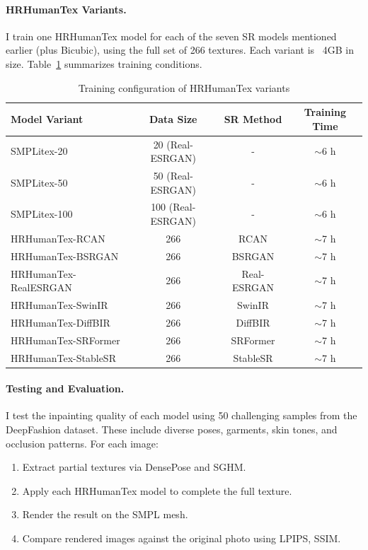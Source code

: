 \paragraph{HRHumanTex Variants.}
I train one HRHumanTex model for each of the seven SR models mentioned earlier (plus Bicubic), using the full set of 266 textures. Each variant is ~4GB in size. Table~\ref{tab:hrhumantex-variants} summarizes training conditions.

\begin{table}[h]
\centering
\caption{Training configuration of HRHumanTex variants}
\label{tab:hrhumantex-variants}
\begin{tabular}{lccc}
\toprule
Model Variant & Data Size & SR Method & Training Time \\
\midrule
SMPLitex-20         & 20 (Real-ESRGAN) & -          & $\sim$6 h \\
SMPLitex-50         & 50 (Real-ESRGAN) & -          & $\sim$6 h \\
SMPLitex-100        & 100 (Real-ESRGAN) & -         & $\sim$6 h \\
HRHumanTex-RCAN     & 266 & RCAN       & $\sim$7 h \\
HRHumanTex-BSRGAN   & 266 & BSRGAN     & $\sim$7 h \\
HRHumanTex-RealESRGAN & 266 & Real-ESRGAN & $\sim$7 h \\
HRHumanTex-SwinIR   & 266 & SwinIR     & $\sim$7 h \\
HRHumanTex-DiffBIR  & 266 & DiffBIR    & $\sim$7 h \\
HRHumanTex-SRFormer & 266 & SRFormer   & $\sim$7 h \\
HRHumanTex-StableSR & 266 & StableSR   & $\sim$7 h \\
\bottomrule
\end{tabular}
\end{table}

\paragraph{Testing and Evaluation.}
I test the inpainting quality of each model using 50 challenging samples from the DeepFashion dataset. These include diverse poses, garments, skin tones, and occlusion patterns. For each image:

\begin{enumerate}
    \item Extract partial textures via DensePose and SGHM.
    \item Apply each HRHumanTex model to complete the full texture.
    \item Render the result on the SMPL mesh.
    \item Compare rendered images against the original photo using LPIPS, SSIM.
\end{enumerate}


